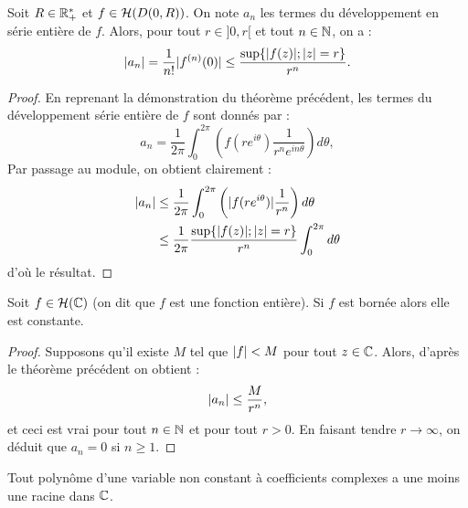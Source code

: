 %

\begin{thm}
Soit $R \in \mathbb{R}_+^{\ast}$ et $f \in \mathcal{H}(D(0,R))$. On note $a_n$ les termes du développement en série entière de $f$.
Alors, pour tout $r \in ]0,r[$ et tout $n \in \mathbb{N}$, on a :
\[ \lvert a_n\rvert = \dfrac1{n!} \lvert f^{(n)}(0)\rvert  \leq \dfrac{\sup \{ \lvert f(z)\rvert ; \lvert z\rvert = r \}}{r^n} . \]
\end{thm}

\begin{proof}
En reprenant la démonstration du théorème précédent, les termes du développement série entière de $f$ sont donnés par :
\[ a_n = \dfrac1{2\pi} \int_0^{2\pi} \left ( f(re^{i\theta}) \dfrac{1}{r^n e^{in\theta}} \right ) d\theta , \]
Par passage au module, on obtient clairement :
\begin{align*}
\lvert a_n\rvert & \leq \dfrac1{2\pi} \int_0^{2\pi} \left ( \lvert f(re^{i\theta})\rvert \dfrac{1}{r^n} \right ) d\theta \\
& \leq \dfrac1{2\pi} \dfrac{\sup \{ \lvert f(z)\rvert ; \lvert z\rvert = r \}}{r^n} \int_0^{2\pi} d \theta
\end{align*}
d'où le résultat.
\end{proof}

\begin{coro}
Soit $f \in \mathcal{H}(\mathbb{C})$ (on dit que $f$ est une fonction entière). Si $f$ est bornée alors elle est constante.
\end{coro}

\begin{proof}
Supposons qu'il existe $M$ tel que $\lvert f\rvert< M$ pour tout $z \in \mathbb{C}$. 
Alors, d'après le théorème précédent on obtient :
\[ \lvert a_n\rvert \leq \dfrac{M}{r^n} , \]
et ceci est vrai pour tout $n \in \mathbb{N}$ et pour tout $r >0$. En faisant tendre $r \to \infty$, on déduit que $a_n = 0$ si $n \geq 1$.
\end{proof}

\begin{coro}
Tout polynôme d'une variable non constant à coefficients complexes a une moins une racine dans $\mathbb{C}$.
\end{coro}

